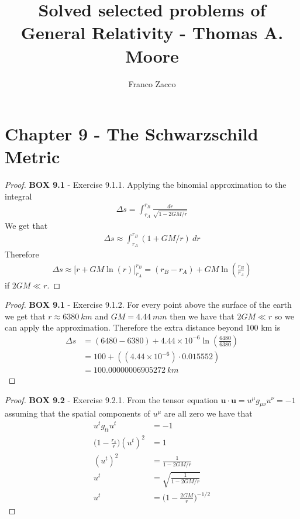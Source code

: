 \documentclass[11pt]{article}
\title{\textbf{Solved selected problems of General Relativity - Thomas A. Moore}}
\author{Franco Zacco}
\date{}
\theoremstyle{definition}
\begin{document}
\maketitle
\thispagestyle{empty}

\section*{Chapter 9 - The Schwarzschild Metric}

\begin{proof}{\textbf{BOX 9.1} - Exercise 9.1.1.}
    Applying the  binomial approximation to the integral
    \begin{align*}
        \Delta s = \int_{r_A}^{r_B} \frac{dr}{\sqrt{1 - 2GM/r}}
    \end{align*}
    We get that
    \begin{align*}
        \Delta s \approx \int_{r_A}^{r_B} (1 + GM/r)~dr
    \end{align*}
    Therefore
    \begin{align*}
        \Delta s \approx \bigg[r + GM\ln(r)\bigg]_{r_A}^{r_B}
        = (r_B - r_A) + GM\ln(\frac{r_B}{r_A})
    \end{align*}
    if $2GM \ll r$.
\end{proof}
\begin{proof}{\textbf{BOX 9.1} - Exercise 9.1.2.}
    For every point above the surface of the earth we get that
    $r \approx 6380~km$ and $GM = 4.44~mm$ then we have that $2GM \ll r$
    so we can apply the approximation.
    Therefore the extra distance beyond 100 km is 
    \begin{align*}
        \Delta s &= (6480 - 6380) + 4.44 \times 10^{-6} \ln(\frac{6480}{6380})\\
            &= 100 + (  (4.44 \times 10^{-6})\cdot 0.015552)\\
            &= 100.00000006905272~km
    \end{align*}
\end{proof}
\cleardoublepage
\begin{proof}{\textbf{BOX 9.2} - Exercise 9.2.1.}
    From the tensor equation $\bm{u}\cdot\bm{u} = u^\mu g_{\mu\nu} u^{\nu} = -1$
    assuming that the spatial components of $u^{\mu}$ are all zero we have that
    \begin{align*}
        u^tg_{tt}u^t &= -1\\
        \bigg(1 - \frac{r_s}{r}\bigg) (u^t)^2 &= 1\\
        (u^t)^2 &= \frac{1}{1 - 2GM/r}\\
        u^t &= \sqrt{\frac{1}{1 - 2GM/r}}\\
        u^t &= \bigg(1 - \frac{2GM}{r}\bigg)^{-1/2}
    \end{align*}
\end{proof}
\end{document}
